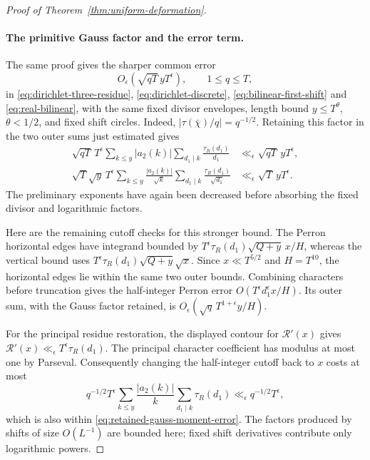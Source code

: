 \begin{proof}[Proof of Theorem~\ref{thm:uniform-deformation}]
\paragraph{The primitive Gauss factor and the error term.}
The same proof gives the sharper common error
\begin{equation}\label{eq:retained-gauss-moment-error}
                         O_\epsilon(\sqrt{qT}\,yT^\epsilon),
                 \qquad 1\le q\le T,
\end{equation}
in \eqref{eq:dirichlet-three-residue},
\eqref{eq:dirichlet-discrete}, \eqref{eq:bilinear-first-shift}
and \eqref{eq:real-bilinear}, with the same fixed divisor envelopes,
length bound $y\le T^\theta$, $\theta<1/2$, and fixed shift circles.
Indeed, $|\tau(\bar\chi)/q|=q^{-1/2}$. Retaining this factor in
the two outer sums just estimated gives
\begin{align*}
 \sqrt{qT}\,T^\epsilon
 \sum_{k\le y}|a_2(k)|\sum_{d_1\mid k}\frac{\tau_R(d_1)}{d_1}
                    &\ll_\epsilon\sqrt{qT}\,yT^\epsilon,\\
 \sqrt T\sqrt y\,T^\epsilon
 \sum_{k\le y}\frac{|a_2(k)|}{\sqrt k}
       \sum_{d_1\mid k}\frac{\tau_R(d_1)}{\sqrt{d_1}}
                    &\ll_\epsilon\sqrt T\,yT^\epsilon.
\end{align*}
The preliminary exponents have again been decreased before absorbing
the fixed divisor and logarithmic factors.

Here are the remaining cutoff checks for this stronger bound.
The Perron horizontal edges have integrand bounded by
$T^\epsilon\tau_R(d_1)\sqrt{Q+y}\,x/H$, whereas the vertical
bound uses $T^\epsilon\tau_R(d_1)\sqrt{Q+y}\sqrt x$.
Since $x\ll T^{5/2}$ and $H=T^{10}$, the horizontal edges lie within
the same two outer bounds. Combining characters before truncation
gives the half-integer Perron error
$O(T^\epsilon d_1^\epsilon x/H)$. Its outer sum, with the Gauss
factor retained, is
$O_\epsilon(\sqrt q\,T^{1+\epsilon}y/H)$.

For the principal residue restoration, the displayed contour for
$\mathcal R'(x)$ gives
$\mathcal R'(x)\ll_\epsilon T^\epsilon\tau_R(d_1)$.
The principal character coefficient has modulus at most one by
Parseval. Consequently changing the half-integer cutoff back to
$x$ costs at most
\[
 q^{-1/2}T^\epsilon
 \sum_{k\le y}\frac{|a_2(k)|}{k}
                  \sum_{d_1\mid k}\tau_R(d_1)
                    \ll_\epsilon q^{-1/2}T^\epsilon,
\]
which is also within \eqref{eq:retained-gauss-moment-error}.
The factors produced by shifts of size $O(L^{-1})$ are bounded here;
fixed shift derivatives contribute only logarithmic powers.


\end{proof}
